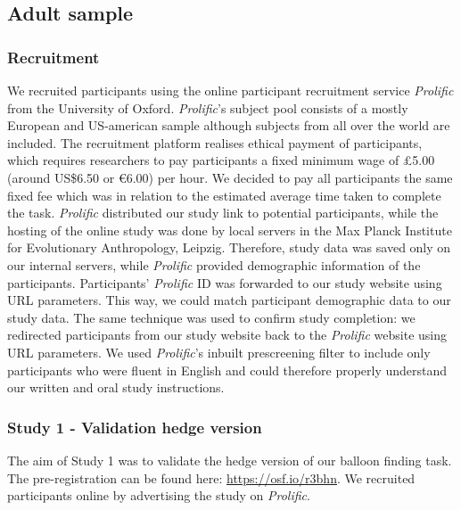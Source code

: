 \documentclass[
  man,floatsintext]{apa6}
\begin{document}
\hypertarget{adult-sample}{%
\subsection{Adult sample}\label{adult-sample}}

\hypertarget{recruitment}{%
\subsubsection{Recruitment}\label{recruitment}}

We recruited participants using the online participant recruitment service \emph{Prolific} from the University of Oxford. \emph{Prolific}'s subject pool consists of a mostly European and US-american sample although subjects from all over the world are included. The recruitment platform realises ethical payment of participants, which requires researchers to pay participants a fixed minimum wage of £5.00 (around US\$6.50 or €6.00) per hour. We decided to pay all participants the same fixed fee which was in relation to the estimated average time taken to complete the task.
\emph{Prolific} distributed our study link to potential participants, while the hosting of the online study was done by local servers in the Max Planck Institute for Evolutionary Anthropology, Leipzig. Therefore, study data was saved only on our internal servers, while \emph{Prolific} provided demographic information of the participants.
Participants' \emph{Prolific} ID was forwarded to our study website using URL parameters. This way, we could match participant demographic data to our study data. The same technique was used to confirm study completion: we redirected participants from our study website back to the \emph{Prolific} website using URL parameters.
We used \emph{Prolific}'s inbuilt prescreening filter to include only participants who were fluent in English and could therefore properly understand our written and oral study instructions.

\hypertarget{study-1---validation-hedge-version}{%
\subsubsection{Study 1 - Validation hedge version}\label{study-1---validation-hedge-version}}

The aim of Study 1 was to validate the hedge version of our balloon finding task. The pre-registration can be found here: \url{https://osf.io/r3bhn}. We recruited participants online by advertising the study on \emph{Prolific}.
\end{document}
